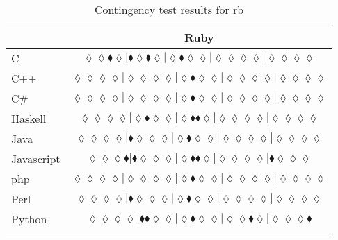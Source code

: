 \begin{table*}
\centering
\begin{tabular}{l c}
& Ruby \\
\hline

C & $\scriptscriptstyle\lozenge\lozenge\blacklozenge\lozenge|\blacklozenge\lozenge\blacklozenge\lozenge|\lozenge\blacklozenge\lozenge\lozenge|\lozenge\lozenge\lozenge\lozenge|\lozenge\lozenge\lozenge\lozenge$ \\
C++ & $\scriptscriptstyle\lozenge\lozenge\lozenge\lozenge|\lozenge\lozenge\lozenge\lozenge|\lozenge\blacklozenge\lozenge\lozenge|\lozenge\lozenge\lozenge\lozenge|\lozenge\lozenge\lozenge\lozenge$ \\
C\# & $\scriptscriptstyle\lozenge\lozenge\lozenge\lozenge|\lozenge\lozenge\lozenge\lozenge|\lozenge\blacklozenge\lozenge\lozenge|\lozenge\lozenge\lozenge\lozenge|\lozenge\lozenge\lozenge\lozenge$ \\
Haskell & $\scriptscriptstyle\lozenge\lozenge\lozenge\lozenge|\lozenge\blacklozenge\lozenge\lozenge|\lozenge\blacklozenge\blacklozenge\lozenge|\lozenge\lozenge\lozenge\lozenge|\lozenge\lozenge\lozenge\lozenge$ \\
Java & $\scriptscriptstyle\lozenge\lozenge\lozenge\lozenge|\blacklozenge\lozenge\lozenge\lozenge|\lozenge\blacklozenge\lozenge\lozenge|\lozenge\lozenge\lozenge\lozenge|\lozenge\lozenge\lozenge\lozenge$ \\
Javascript & $\scriptscriptstyle\lozenge\lozenge\lozenge\blacklozenge|\blacklozenge\lozenge\lozenge\lozenge|\lozenge\blacklozenge\blacklozenge\lozenge|\lozenge\lozenge\lozenge\lozenge|\blacklozenge\lozenge\lozenge\lozenge$ \\
{\sc php} & $\scriptscriptstyle\lozenge\lozenge\lozenge\lozenge|\lozenge\lozenge\lozenge\lozenge|\lozenge\blacklozenge\lozenge\lozenge|\lozenge\lozenge\lozenge\lozenge|\lozenge\lozenge\lozenge\lozenge$ \\
Perl & $\scriptscriptstyle\lozenge\lozenge\lozenge\lozenge|\blacklozenge\lozenge\lozenge\lozenge|\lozenge\blacklozenge\lozenge\lozenge|\lozenge\lozenge\lozenge\lozenge|\lozenge\lozenge\lozenge\lozenge$ \\
Python & $\scriptscriptstyle\lozenge\lozenge\lozenge\lozenge|\blacklozenge\blacklozenge\lozenge\lozenge|\lozenge\blacklozenge\lozenge\lozenge|\lozenge\lozenge\blacklozenge\lozenge|\lozenge\lozenge\lozenge\blacklozenge$ \\

\hline
& \\
\end{tabular}
\caption{Contingency test results for rb}
\label{tbl:contingency-test-results-rb}
\end{table*}

